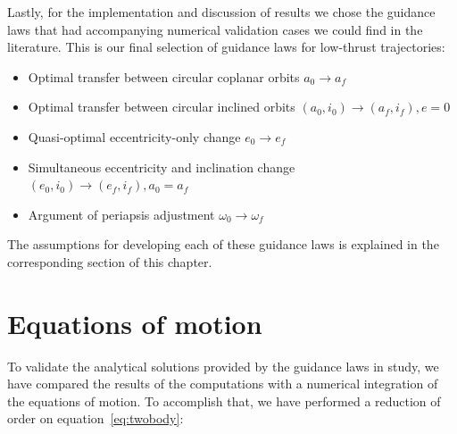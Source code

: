 Lastly, for the implementation and discussion of results we chose the guidance laws that had accompanying numerical validation cases we could find in the literature. This is our final selection of guidance laws for low-thrust trajectories:

\begin{itemize}

\item Optimal transfer between circular coplanar orbits $a_0 \rightarrow a_f$ \cite{edelbaum1961propulsion,burt1967space}

\item Optimal transfer between circular inclined orbits $(a_0, i_0) \rightarrow (a_f, i_f), e = 0$ \cite{edelbaum1961propulsion,kechichian1997reformulation}

\item Quasi-optimal eccentricity-only change $e_0 \rightarrow e_f$ \cite{pollard1997simplified}

\item Simultaneous eccentricity and inclination change $(e_0, i_0) \rightarrow (e_f, i_f), a_0 = a_f$ \cite{pollard2000simplified}

\item Argument of periapsis adjustment $\omega_0 \rightarrow \omega_f$ \cite{pollard1998evaluation}

\end{itemize}

The assumptions for developing each of these guidance laws is explained in the corresponding section of this chapter.

\section{Equations of motion} \label{sec:motion}

To validate the analytical solutions provided by the guidance laws in study, we have compared the results of the computations with a numerical integration of the equations of motion. To accomplish that, we have performed a reduction of order on equation~\ref{eq:twobody}:
% 
% 
%
%

